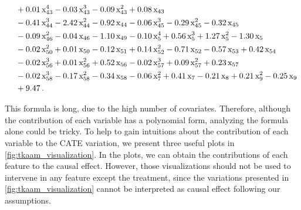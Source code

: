\begin{samepage}
\begin{align*}
&\quad + 0.01\,\text{x}_{43}^{4} - 0.03\,\text{x}_{43}^{3} - 0.09\,\text{x}_{43}^{2} + 0.08\,\text{x}_{43} \\
&\quad - 0.41\,\text{x}_{44}^{3} - 2.42\,\text{x}_{44}^{2} - 0.92\,\text{x}_{44}
- 0.06\,\text{x}_{45}^{3} - 0.29\,\text{x}_{45}^{2} - 0.32\,\text{x}_{45} \\
&\quad - 0.09\,\text{x}_{46}^{2} - 0.04\,\text{x}_{46}
- 1.10\,\text{x}_{49}
- 0.10\,\text{x}_{5}^{4} + 0.56\,\text{x}_{5}^{3} + 1.27\,\text{x}_{5}^{2} - 1.30\,\text{x}_{5} \\
&\quad - 0.02\,\text{x}_{50}^{2} + 0.01\,\text{x}_{50}
- 0.12\,\text{x}_{51}
+ 0.14\,\text{x}_{52}^{2} - 0.71\,\text{x}_{52}
- 0.57\,\text{x}_{53}
+ 0.42\,\text{x}_{54} \\
&\quad - 0.02\,\text{x}_{56}^{3} + 0.01\,\text{x}_{56}^{2} + 0.52\,\text{x}_{56}
- 0.02\,\text{x}_{57}^{3} + 0.09\,\text{x}_{57}^{2} + 0.23\,\text{x}_{57} \\
&\quad - 0.02\,\text{x}_{58}^{3} - 0.17\,\text{x}_{58}^{2} - 0.34\,\text{x}_{58}
- 0.06\,\text{x}_{7}^{2} + 0.41\,\text{x}_{7}
- 0.21\,\text{x}_{8}
+ 0.21\,\text{x}_{9}^{2} - 0.25\,\text{x}_{9} \\
&\quad + 9.47 \, .
\end{align*}
\end{samepage}

This formula is long, due to the high number of covariates. Therefore, although the contribution of each variable has a polynomial form, analyzing the formula alone could be tricky. To help to gain intuitions about the contribution of each variable to the CATE variation, we present three useful plots in \cref{fig:tkaam_visualization}. In the plots, we can obtain the contributions of each feature to the causal effect. However, those visualizations should not be used to intervene in any feature except the treatment, since the variations presented in \cref{fig:tkaam_visualization} cannot be interpreted as causal effect following our assumptions.

